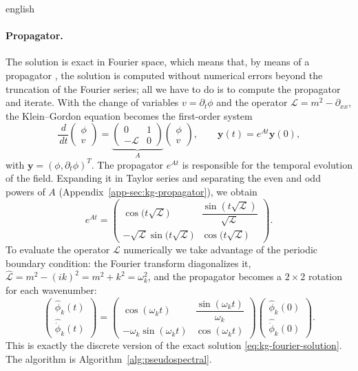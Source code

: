 \documentclass[0000.tex]{subfiles}
\begin{document}
\begin{hyphenrules}{english}
\paragraph{Propagator.}
The solution is exact in Fourier space, which means that, by means of a propagator
\cite{hochbruck2010}, the solution is computed without numerical errors beyond the truncation of the
Fourier series; all we have to do is to compute the propagator and iterate. With the change of variables
$v=\partial_t\phi$ and the operator $\mathcal{L}=m^2-\partial_{xx}$, the Klein--Gordon equation becomes
the first-order system
\begin{equation}
  \frac{\,d}{\,d t}\begin{pmatrix}\phi\\ v\end{pmatrix}
  =\underbrace{\begin{pmatrix}0 & 1\\ -\mathcal{L} & 0\end{pmatrix}}_{A}
  \begin{pmatrix}\phi\\ v\end{pmatrix},
  \qquad\mathbf{y}(t)=e^{At}\mathbf{y}(0),
  \label{eq:kg-first-order}
\end{equation}
with $\mathbf{y}=(\phi,\partial_t\phi)^{T}$. The propagator $e^{At}$ is responsible for the temporal
evolution of the field. Expanding it in Taylor series and separating the even and odd powers of $A$
(Appendix~\ref{app-sec:kg-propagator}), we obtain
\begin{equation}
  e^{At}=\begin{pmatrix}
    \cos\big(t\sqrt{\mathcal{L}}\big) & \dfrac{\sin(t\sqrt{\mathcal{L}})}{\sqrt{\mathcal{L}}}\\[2mm]
    -\sqrt{\mathcal{L}}\sin\big(t\sqrt{\mathcal{L}}\big) & \cos\big(t\sqrt{\mathcal{L}}\big)
  \end{pmatrix}.
  \label{eq:kg-propagator}
\end{equation}
To evaluate the
operator $\mathcal{L}$ numerically we take advantage of the periodic boundary condition: the Fourier
transform diagonalizes it, $\widehat{\mathcal{L}}=m^2-(ik)^2=m^2+k^2=\omega_k^2$, and the propagator becomes
a $2\times2$ rotation for each wavenumber:
\begin{equation}
  \begin{pmatrix}\hat\phi_k(t)\\ \hat{\dot\phi}_k(t)\end{pmatrix}
  =\begin{pmatrix}
    \cos(\omega_kt) & \dfrac{\sin(\omega_kt)}{\omega_k}\\[2mm]
    -\omega_k\sin(\omega_kt) & \cos(\omega_kt)
  \end{pmatrix}
  \begin{pmatrix}\hat\phi_k(0)\\ \hat{\dot\phi}_k(0)\end{pmatrix}.
  \label{eq:kg-propagator-fourier}
\end{equation}
This is exactly the discrete version of the exact solution \eqref{eq:kg-fourier-solution}. The algorithm
is Algorithm~\ref{alg:pseudospectral}.


\end{hyphenrules}
\end{document}
